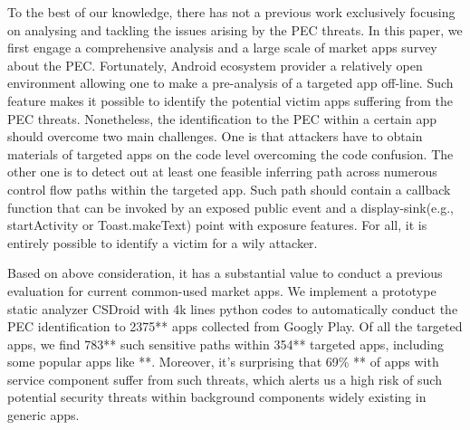 \documentclass{sig-alternate-05-2015}
\begin{document}
To the best of our knowledge, there has not a previous work exclusively focusing on analysing and tackling the issues arising by the PEC threats. In this paper, we first engage a comprehensive analysis and a large scale of market apps survey about the PEC. Fortunately, Android ecosystem provider a relatively open environment allowing one to make a pre-analysis of a targeted app off-line. Such feature makes it possible to identify the potential victim apps suffering from the PEC threats. Nonetheless, the identification to the PEC within a certain app should overcome two main challenges. One is that attackers have to obtain materials of targeted apps on the code level overcoming the code confusion. The other one is to detect out at least one feasible inferring path across numerous control flow paths within the targeted app. Such path should contain a callback function that can be invoked by an exposed public event and a display-sink(e.g., startActivity or Toast.makeText) point with exposure features. For all, it is entirely possible to identify a victim for a wily attacker. 


Based on above consideration, it has a substantial value to conduct a previous evaluation for current common-used market apps. We implement a prototype static analyzer CSDroid with 4k lines python codes to automatically conduct the PEC identification to 2375** apps collected from Googly Play. Of all the targeted apps, we find 783** such sensitive paths within 354** targeted apps, including some popular apps like **. Moreover, it's surprising that 69\% **  of apps with service component suffer from such threats, which alerts us a high risk of such potential security threats within background components widely existing in generic apps.  

\end{document}
